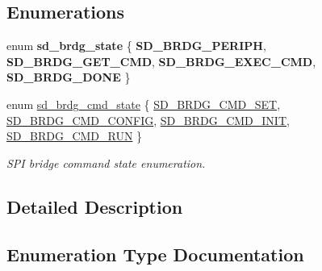 \subsection*{Enumerations}
\begin{DoxyCompactItemize}
\item 
\mbox{\label{group___s_d___b_r_d_g___types_ga9f6844ada9a6ffbaa3705965aaff6988}} 
enum {\bfseries sd\+\_\+brdg\+\_\+state} \{ {\bfseries S\+D\+\_\+\+B\+R\+D\+G\+\_\+\+P\+E\+R\+I\+PH}, 
{\bfseries S\+D\+\_\+\+B\+R\+D\+G\+\_\+\+G\+E\+T\+\_\+\+C\+MD}, 
{\bfseries S\+D\+\_\+\+B\+R\+D\+G\+\_\+\+E\+X\+E\+C\+\_\+\+C\+MD}, 
{\bfseries S\+D\+\_\+\+B\+R\+D\+G\+\_\+\+D\+O\+NE}
 \}
\item 
enum \mbox{\hyperlink{group___s_d___b_r_d_g___types_gaa60a189c7c824797307ab14f0c594610}{sd\+\_\+brdg\+\_\+cmd\+\_\+state}} \{ \mbox{\hyperlink{group___s_d___b_r_d_g___types_ggaa60a189c7c824797307ab14f0c594610a53d0e736864a72c399401b041b2ed480}{S\+D\+\_\+\+B\+R\+D\+G\+\_\+\+C\+M\+D\+\_\+\+S\+ET}}, 
\mbox{\hyperlink{group___s_d___b_r_d_g___types_ggaa60a189c7c824797307ab14f0c594610a10ff89b58f2416dfdda70109dd4af893}{S\+D\+\_\+\+B\+R\+D\+G\+\_\+\+C\+M\+D\+\_\+\+C\+O\+N\+F\+IG}}, 
\mbox{\hyperlink{group___s_d___b_r_d_g___types_ggaa60a189c7c824797307ab14f0c594610ab7fed0c59ac43c49153a351b573400f4}{S\+D\+\_\+\+B\+R\+D\+G\+\_\+\+C\+M\+D\+\_\+\+I\+N\+IT}}, 
\mbox{\hyperlink{group___s_d___b_r_d_g___types_ggaa60a189c7c824797307ab14f0c594610a8ad37d4a1369795a68e6c8745a93898b}{S\+D\+\_\+\+B\+R\+D\+G\+\_\+\+C\+M\+D\+\_\+\+R\+UN}}
 \}
\begin{DoxyCompactList}\small\item\em S\+PI bridge command state enumeration. \end{DoxyCompactList}\end{DoxyCompactItemize}


\subsection{Detailed Description}


\subsection{Enumeration Type Documentation}
\mbox{\label{group___s_d___b_r_d_g___types_gaa60a189c7c824797307ab14f0c594610}} 
